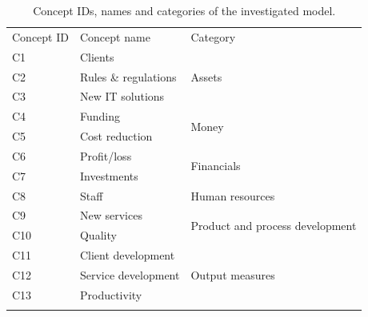 \documentclass[graybox]{svmult}
\begin{document}
\begin{table}
\caption{Concept IDs, names and categories of the investigated model.}
\label{tab:OMcategories}
\begin{center}
\begin{tabular}{lll}
\hline\noalign{\smallskip}
Concept ID & Concept name & Category\\
\noalign{\smallskip}\svhline\noalign{\smallskip}
C1 & Clients & \multirow{3}{*}{Assets}\\
C2 & Rules \& regulations & \\
C3 & New IT solutions & \\
\noalign{\smallskip} \hline \noalign{\smallskip}
C4 & Funding & \multirow{2}{*}{Money}\\
C5 & Cost reduction & \\
\noalign{\smallskip} \hline \noalign{\smallskip}
C6 & Profit/loss & \multirow{2}{*}{Financials}\\
C7 & Investments & \\
\noalign{\smallskip} \hline \noalign{\smallskip}
C8 & Staff & Human resources\\
\noalign{\smallskip} \hline \noalign{\smallskip}
C9 & New services & \multirow{2}{*}{Product and process development}\\
C10 & Quality & \\
\noalign{\smallskip} \hline \noalign{\smallskip}
C11 & Client development & \multirow{3}{*}{Output measures}\\
C12 & Service development & \\
C13 & Productivity & \\
\noalign{\smallskip} \hline
\end{tabular}
\end{center}
\end{table}
\end{document}
